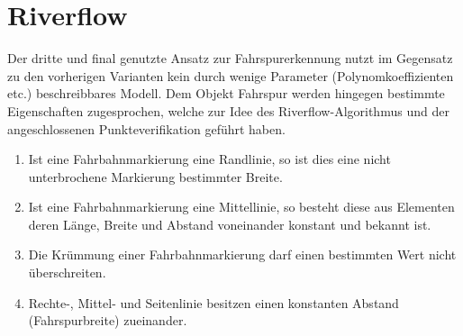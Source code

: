 \section{Riverflow}
Der dritte und final genutzte Ansatz zur Fahrspurerkennung nutzt im Gegensatz zu den vorherigen Varianten kein durch wenige Parameter (Polynomkoeffizienten etc.) beschreibbares Modell. Dem Objekt Fahrspur werden hingegen bestimmte Eigenschaften zugesprochen, welche zur Idee des Riverflow-Algorithmus \autocite{limRiverFlowLane2012} und der angeschlossenen Punkteverifikation geführt haben.
\begin{enumerate}
\item \label{item:riverflow:rule:solidline}
Ist eine Fahrbahnmarkierung eine Randlinie, so ist dies eine nicht unterbrochene Markierung bestimmter Breite.
\item \label{item:riverflow:rule:dashedline}
Ist eine Fahrbahnmarkierung eine Mittellinie, so besteht diese aus Elementen deren Länge, Breite und Abstand voneinander konstant und bekannt ist.
\item \label{item:riverflow:rule:curvature}
Die Krümmung einer Fahrbahnmarkierung darf einen bestimmten Wert nicht überschreiten.
\item \label{item:riverflow:rule:distance}
Rechte-, Mittel- und Seitenlinie besitzen einen konstanten Abstand (Fahrspurbreite) zueinander.
\end{enumerate} 


